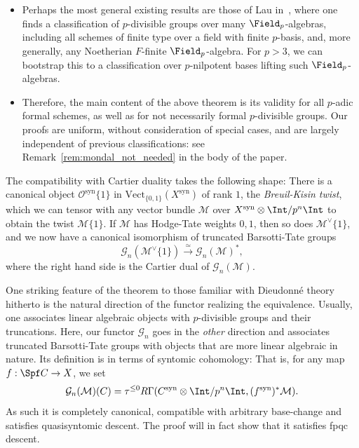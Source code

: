 \documentclass[10pt]{amsart}
\begin{document}
\begin{introrem}
\begin{itemize}
   \item Perhaps the most general existing results are those of Lau in~\cite{lau2018divided}, where one finds a classification of $p$-divisible groups over many $\Field_p$-algebras, including all schemes of finite type over a field with finite $p$-basis, and, more generally, any Noetherian $F$-finite $\Field_p$-algebra. For $p>3$, we can bootstrap this to a classification over $p$-nilpotent bases lifting such $\Field_p$-algebras.

   \item Therefore, the main content of the above theorem is its validity for all $p$-adic formal schemes, as well as for not necessarily formal $p$-divisible groups. Our proofs are uniform, without consideration of special cases, and are largely independent of previous classifications: see Remark~\ref{rem:mondal_not_needed} in the body of the paper.
\end{itemize}
\end{introrem}




\begin{introrem}
The compatibility with Cartier duality takes the following shape: There is a canonical object $\mathcal{O}^{\mathrm{syn}}\{1\}$ in $\mathrm{Vect}_{\{0,1\}}(X^{\mathrm{syn}})$ of rank $1$, the \emph{Breuil-Kisin twist}, which we can tensor with any vector bundle $\mathcal{M}$ over $X^{\mathrm{syn}}\otimes\Int/p^n\Int$ to obtain the twist $\mathcal{M}\{1\}$. If $\mathcal{M}$ has Hodge-Tate weights $0,1$, then so does $\mathcal{M}^\vee\{1\}$, and we now have a canonical isomorphism of truncated Barsotti-Tate groups
\[
\mathcal{G}_n(\mathcal{M}^\vee\{1\})\xrightarrow{\simeq}\mathcal{G}_n(\mathcal{M})^*,
\]
where the right hand side is the Cartier dual of $\mathcal{G}_n(\mathcal{M})$.
\end{introrem}

\begin{introrem}
\label{introrem:syn_cohom}
One striking feature of the theorem to those familiar with Dieudonn\'e theory hitherto is the natural direction of the functor realizing the equivalence. Usually, one associates linear algebraic objects with $p$-divisible groups and their truncations. Here, our functor $\mathcal{G}_n$ goes in the \emph{other} direction and associates truncated Barsotti-Tate groups with objects that are more linear algebraic in nature. Its definition is in terms of syntomic cohomology: That is, for any map $f:\Spf C\to X$, we set
\[
\mathcal{G}_n(\mathcal{M})(C) = \tau^{\le 0}R\Gamma(C^{\mathrm{syn}}\otimes\Int/p^n\Int,(f^{\mathrm{syn}})^*\mathcal{M}).
\]
As such it is completely canonical, compatible with arbitrary base-change and satisfies quasisyntomic descent. The proof will in fact show that it satisfies fpqc descent.
\end{introrem}
\end{document}

